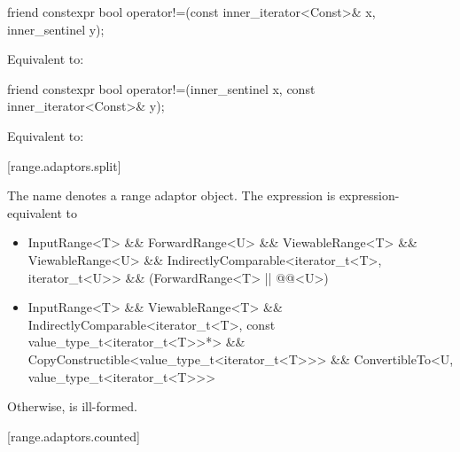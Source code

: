 {{%
\begin{itemdecl}
friend constexpr bool operator!=(const inner_iterator<Const>& x, inner_sentinel y);
\end{itemdecl}

\begin{itemdescr}
\pnum
\effects Equivalent to: 
\end{itemdescr}

%
\begin{itemdecl}
friend constexpr bool operator!=(inner_sentinel x, const inner_iterator<Const>& y);
\end{itemdecl}

\begin{itemdescr}
\pnum
\effects Equivalent to: 
\end{itemdescr}
} %

[range.adaptors.split]{}

\pnum
The name  denotes a range adaptor
object.
 The expression
  is expression-equivalent to 
{\color{oldclr}
\begin{itemize}
\item \begin{codeblock}
InputRange<T> && ForwardRange<U> &&
ViewableRange<T> && ViewableRange<U> &&
IndirectlyComparable<iterator_t<T>, iterator_t<U>> &&
(ForwardRange<T> || @@<U>)
\end{codeblock}

\item \begin{codeblock}
InputRange<T> && ViewableRange<T> &&
IndirectlyComparable<iterator_t<T>, const value_type_t<iterator_t<T>>*> &&
CopyConstructible<value_type_t<iterator_t<T>>> &&
ConvertibleTo<U, value_type_t<iterator_t<T>>>
\end{codeblock}
\end{itemize}
Otherwise,  is ill-formed.
} %


[range.adaptors.counted]{}

}
